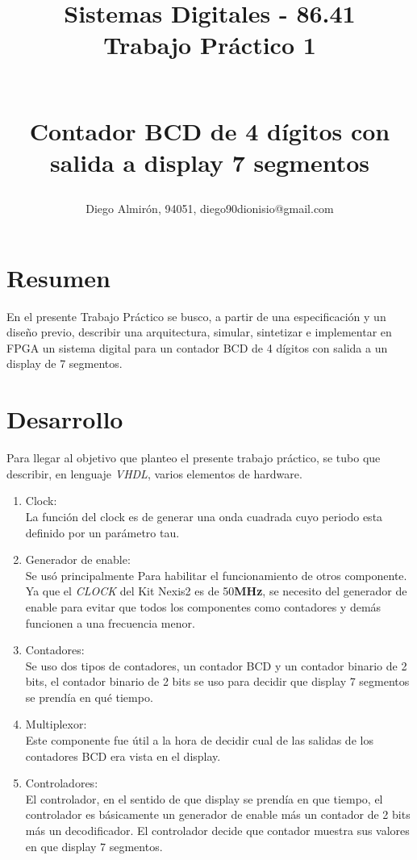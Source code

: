 \documentclass[10pt,a4paper]{article}
\author{Diego Almirón, 94051, diego90dionisio@gmail.com}
\title{
\begin{small}
Sistemas Digitales - 86.41 \\
Trabajo Práctico 1
\end{small}
\\ Contador BCD de 4 dígitos con salida a display 7 segmentos
}
\begin{document}
\maketitle
\section*{Resumen}
En el presente Trabajo Práctico se busco, a partir de una especificación y un 
diseño previo, describir una arquitectura, simular, sintetizar e implementar en
FPGA un sistema digital para un contador BCD de 4 dígitos con salida a un 
display de 7 segmentos. 
\section*{Desarrollo}
Para llegar al objetivo que planteo el presente trabajo práctico, se tubo que 
describir, en lenguaje \textit{VHDL}, varios elementos de hardware.
\begin{enumerate}
\item Clock: \\
La función del clock es de generar una onda cuadrada cuyo periodo esta definido 
por un parámetro tau.
\item Generador de enable: \\
Se usó principalmente Para habilitar el funcionamiento de otros componente. Ya 
que el \textit{CLOCK} del Kit Nexis2 es de 50\textbf{MHz}, se necesito del 
generador de enable para evitar que todos los componentes como contadores y 
demás funcionen a una frecuencia menor. 
\item Contadores: \\
Se uso dos tipos de contadores, un contador BCD y un contador binario de 2 
bits, el contador binario de 2 bits se uso para decidir que display 7 
segmentos se prendía en qué tiempo.
\item Multiplexor: \\
Este componente fue útil a la hora de decidir cual de las salidas de los 
contadores BCD era vista en el display.
\item Controladores: \\
El controlador, en el sentido de que display se prendía en que tiempo, el 
controlador es básicamente un generador de enable más un contador de 2 bits 
más un decodificador. El controlador decide que contador muestra sus valores 
en que display 7 segmentos.
\end{enumerate}
\end{document}
